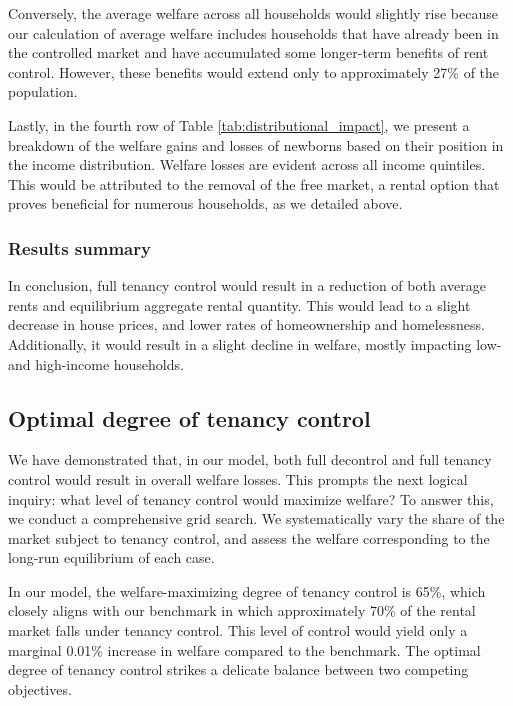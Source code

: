 \documentclass[parskip=full]{article}
\begin{document}
Conversely, the average welfare across all households would slightly rise because our calculation of average welfare includes households that have already been in the controlled market and have accumulated some longer-term benefits of rent control. However, these benefits would extend only to approximately 27\% of the population.

Lastly, in the fourth row of Table \ref{tab:distributional_impact}, we present a breakdown of the welfare gains and losses of newborns based on their position in the income distribution. Welfare losses are evident across all income quintiles. This would be attributed to the removal of the free market, a rental option that proves beneficial for numerous households, as we detailed above.

\subsubsection{Results summary}

In conclusion, full tenancy control would result in a reduction of both average rents and equilibrium aggregate rental quantity. This would lead to a slight decrease in house prices, and lower rates of homeownership and homelessness. Additionally, it would result in a slight decline in welfare, mostly impacting low- and high-income households. 

\subsection{Optimal degree of tenancy control}\label{subsection:optimal_control}

We have demonstrated that, in our model, both full decontrol and full tenancy control would result in overall welfare losses. This prompts the next logical inquiry: what level of tenancy control would maximize welfare? To answer this, we conduct a comprehensive grid search. We systematically vary the share of the market subject to tenancy control, and assess the welfare corresponding to the long-run equilibrium of each case.

In our model, the welfare-maximizing degree of tenancy control is 65\%, which closely aligns with our benchmark in which approximately 70\% of the rental market falls under tenancy control. This level of control would yield only a marginal 0.01\% increase in welfare compared to the benchmark. The optimal degree of tenancy control strikes a delicate balance between two competing objectives.
\end{document}
